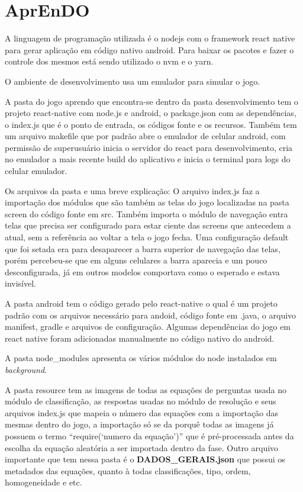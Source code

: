 \section[AprEnDO]{AprEnDO}

A linguagem de programação utilizada é o nodejs com o framework react native para gerar aplicação em código nativo android. Para baixar os pacotes e fazer o controle dos mesmos está sendo utilizado o nvm e o yarn.

O ambiente de desenvolvimento usa um emulador para simular o jogo.

A pasta do jogo aprendo que encontra-se dentro da pasta desenvolvimento tem o projeto react-native com node.js e android, o package.json com as dependências, o index.js que é o ponto de entrada, os códigos fonte e os recursos. Também tem um arquivo makefile que por padrão abre o emulador de celular android, com permissão de superusuário inicia o servidor do react para desenvolvimento, cria no emulador a mais recente build do aplicativo e inicia o terminal para logs do celular emulador.

Os arquivos da pasta e uma breve explicação:
O arquivo index.js faz a importação dos módulos que são também as telas do jogo localizadas na pasta screen do código fonte em src. Também importa o módulo de navegação entra telas que precisa ser configurado para estar ciente das screens que antecedem a atual, sem a referência ao voltar a tela o jogo fecha. Uma configuração default que foi setada era para desaparecer a barra superior de navegação das telas, porém percebeu-se que em alguns celulares a barra aparecia e um pouco desconfigurada, já em outros modelos comportava como o esperado e estava invisível. 

A pasta android tem o código gerado pelo react-native o qual é um projeto padrão com os arquivos necessário para andoid, código fonte em .java, o arquivo manifest, gradle e arquivos de configuração. Algumas dependências do jogo em react native foram adicionadas manualmente no código nativo do android.

A pasta node\_modules apresenta os vários módulos do node instalados em \textit{background}.

A pasta resource tem as imagens de todas as equações de perguntas usada no módulo de classificação, as respostas usadas no módulo de resolução e seus arquivos index.js que mapeia o número das equações com a importação  das mesmas dentro do jogo, a importação só se da porquê todas as imagens já possuem o termo “require(‘numero da equação’)” que é pré-processada antes da escolha da equação aleatória a ser importada dentro da fase. Outro arquivo importante que tem nessa pasta é o \textbf{DADOS\_GERAIS.json} que possui os metadados das equações, quanto à todas classificações, tipo, ordem, homogeneidade e etc.


